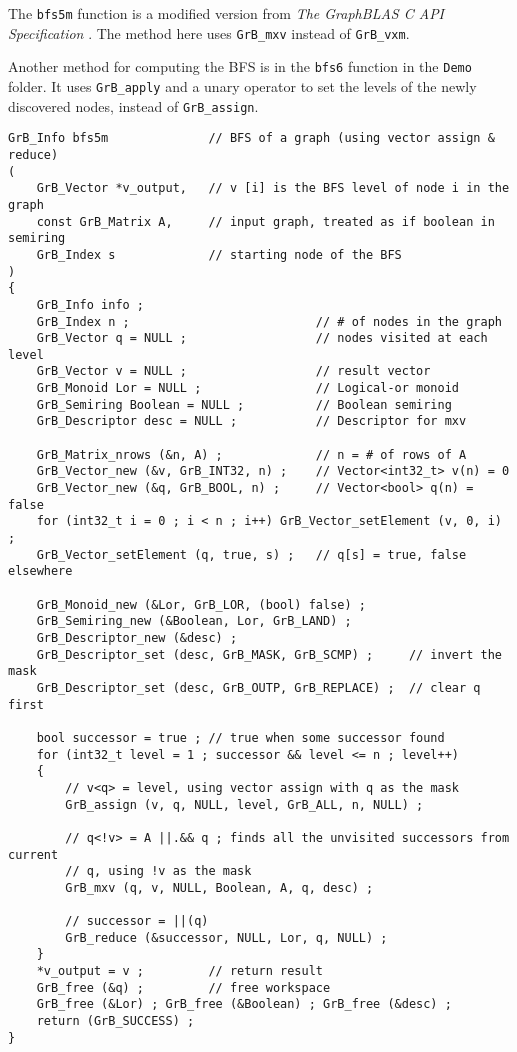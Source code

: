 \documentclass[12pt]{article}
\begin{document}
The \verb'bfs5m' function is a modified version from {\em The GraphBLAS
C API Specification} \cite{spec}.  The method here uses \verb'GrB_mxv'
instead of \verb'GrB_vxm'.

Another method for computing the BFS is in the \verb'bfs6' function in the
\verb'Demo' folder.  It uses \verb'GrB_apply' and a unary operator to set the
levels of the newly discovered nodes, instead of
\verb'GrB_assign'.

\newpage
\begin{mdframed}[userdefinedwidth=6in]
{\footnotesize
\begin{verbatim}
GrB_Info bfs5m              // BFS of a graph (using vector assign & reduce)
(
    GrB_Vector *v_output,   // v [i] is the BFS level of node i in the graph
    const GrB_Matrix A,     // input graph, treated as if boolean in semiring
    GrB_Index s             // starting node of the BFS
)
{
    GrB_Info info ;
    GrB_Index n ;                          // # of nodes in the graph
    GrB_Vector q = NULL ;                  // nodes visited at each level
    GrB_Vector v = NULL ;                  // result vector
    GrB_Monoid Lor = NULL ;                // Logical-or monoid
    GrB_Semiring Boolean = NULL ;          // Boolean semiring
    GrB_Descriptor desc = NULL ;           // Descriptor for mxv

    GrB_Matrix_nrows (&n, A) ;             // n = # of rows of A
    GrB_Vector_new (&v, GrB_INT32, n) ;    // Vector<int32_t> v(n) = 0
    GrB_Vector_new (&q, GrB_BOOL, n) ;     // Vector<bool> q(n) = false
    for (int32_t i = 0 ; i < n ; i++) GrB_Vector_setElement (v, 0, i) ;
    GrB_Vector_setElement (q, true, s) ;   // q[s] = true, false elsewhere

    GrB_Monoid_new (&Lor, GrB_LOR, (bool) false) ;
    GrB_Semiring_new (&Boolean, Lor, GrB_LAND) ;
    GrB_Descriptor_new (&desc) ;
    GrB_Descriptor_set (desc, GrB_MASK, GrB_SCMP) ;     // invert the mask
    GrB_Descriptor_set (desc, GrB_OUTP, GrB_REPLACE) ;  // clear q first

    bool successor = true ; // true when some successor found
    for (int32_t level = 1 ; successor && level <= n ; level++)
    {
        // v<q> = level, using vector assign with q as the mask
        GrB_assign (v, q, NULL, level, GrB_ALL, n, NULL) ;

        // q<!v> = A ||.&& q ; finds all the unvisited successors from current
        // q, using !v as the mask
        GrB_mxv (q, v, NULL, Boolean, A, q, desc) ;

        // successor = ||(q)
        GrB_reduce (&successor, NULL, Lor, q, NULL) ;
    }
    *v_output = v ;         // return result
    GrB_free (&q) ;         // free workspace
    GrB_free (&Lor) ; GrB_free (&Boolean) ; GrB_free (&desc) ;
    return (GrB_SUCCESS) ;
} \end{verbatim}} 
\end{mdframed}
\end{document}

